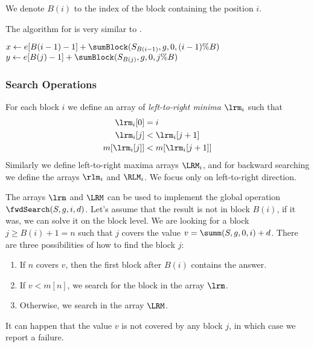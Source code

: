 \bigbreak

We denote $B(i)$ to the index of the block containing the position $i$.

The algorithm for \summ is very similar to \sumBlock.

\begin{algorithm}
\begin{algorithmic}
	\State $x \gets e[B(i - 1) - 1] + \sumBlock(S_{B(i - 1)}, g, 0, (i - 1) \% B)$
	\State $y \gets e[B(j) - 1] + \sumBlock(S_{B(j)}, g, 0, j \% B)$
	\State {}
\EndFunction
\end{algorithmic}
\end{algorithm}

\subsubsection{Search Operations}

For each block $i$ we define an array of \emph{left-to-right minima} $\lrm_i$ such that
\begin{align*}
	\lrm_i[0] &= i \\
	\lrm_i[j] &< \lrm_i[j+1] \\
	m[\lrm_i[j]] &< m[\lrm_i[j+1]]
\end{align*}
Similarly we define left-to-right maxima arrays $\LRM_i$, and for backward searching we define the arrays $\rlm_i$ and $\RLM_i$.
We focus only on left-to-right direction.

The arrays $\lrm$ and $\LRM$ can be used to implement the global operation $\fwdSearch(S, g, i, d)$.
Let's assume that the result is not in block $B(i)$, if it was, we can solve it on the block level.
We are looking for a block $j \ge B(i) + 1 = n$ such that $j$ covers the value $v = \summ(S, g, 0, i) + d$.
There are three possibilities of how to find the block $j$:
\begin{enumerate}
	\item If $n$ covers $v$, then the first block after $B(i)$ contains the answer.
	\item If $v < m[n]$, we search for the block in the array $\lrm$.
	\item Otherwise, we search in the array $\LRM$.
\end{enumerate}
It can happen that the value $v$ is not covered by any block $j$, in which case we report a failure.


